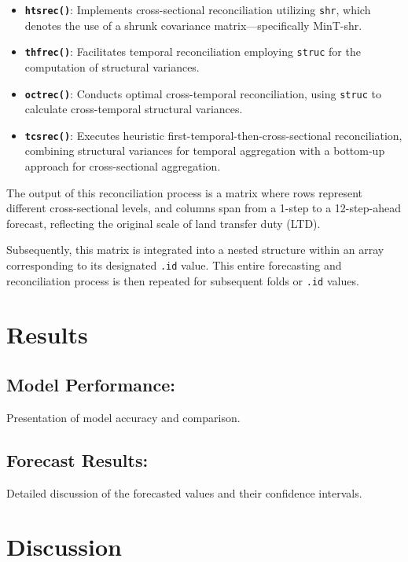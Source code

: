 \documentclass[11pt,a4paper,]{article}
\providecommand{\tightlist}{%
  \setlength{\itemsep}{0pt}\setlength{\parskip}{0pt}}
\begin{document}
\begin{itemize}
\tightlist
\item
  \textbf{\texttt{htsrec()}}: Implements cross-sectional reconciliation utilizing \texttt{shr}, which denotes the use of a shrunk covariance matrix---specifically MinT-shr.
\item
  \textbf{\texttt{thfrec()}}: Facilitates temporal reconciliation employing \texttt{struc} for the computation of structural variances.
\item
  \textbf{\texttt{octrec()}}: Conducts optimal cross-temporal reconciliation, using \texttt{struc} to calculate cross-temporal structural variances.
\item
  \textbf{\texttt{tcsrec()}}: Executes heuristic first-temporal-then-cross-sectional reconciliation, combining structural variances for temporal aggregation with a bottom-up approach for cross-sectional aggregation.
\end{itemize}

The output of this reconciliation process is a matrix where rows represent different cross-sectional levels, and columns span from a 1-step to a 12-step-ahead forecast, reflecting the original scale of land transfer duty (LTD).

Subsequently, this matrix is integrated into a nested structure within an array corresponding to its designated \texttt{.id} value. This entire forecasting and reconciliation process is then repeated for subsequent folds or \texttt{.id} values.

\section{Results}\label{results}

\subsection{Model Performance:}\label{model-performance}

Presentation of model accuracy and comparison.

\subsection{Forecast Results:}\label{forecast-results}

Detailed discussion of the forecasted values and their confidence intervals.

\section{Discussion}\label{discussion}
\end{document}
